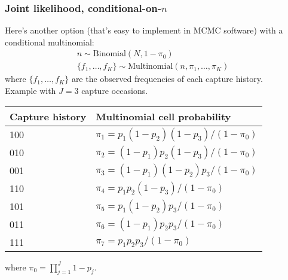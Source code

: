 \documentclass[color=usenames,dvipsnames]{beamer}\usepackage[]{graphicx}\usepackage[]{color}
\begin{document}
\begin{frame}
  \frametitle{Joint likelihood, conditional-on-$n$}
  \footnotesize
  Here's another option (that's easy to implement in MCMC software) with a conditional multinomial: \\
  \begin{gather*}
    n \sim \mathrm{Binomial}\left(N, 1-\pi_0\right)                      \\
    \{f_1, \dots, f_K\} \sim \mathrm{Multinomial}(n, \pi_1, \dots, \pi_K) \;\;
  \end{gather*}
  where $\{f_1, \dots, f_K\}$ are the observed frequencies of each
  capture history. \\
  \pause \vfill
  Example with $J=3$ capture occasions.                                          \\
  \scriptsize
  \vspace{6pt}
  \centering
    \begin{tabular}{ll}
      \hline
      Capture history & Multinomial cell probability        \\
      \hline
      100                   & $\pi_1=p_1(1-p_2)(1-p_3)/(1-\pi_0)$ \\
      010                   & $\pi_2=(1-p_1)p_2(1-p_3)/(1-\pi_0)$ \\
      001                   & $\pi_3=(1-p_1)(1-p_2)p_3/(1-\pi_0)$ \\
      110                   & $\pi_4=p_1p_2(1-p_3)/(1-\pi_0)$     \\
      101                   & $\pi_5=p_1(1-p_2)p_3/(1-\pi_0)$     \\
      011                   & $\pi_6=(1-p_1)p_2p_3/(1-\pi_0)$     \\
      111                   & $\pi_7 = p_1p_2p_3/(1-\pi_0)$       \\
      \hline
    \end{tabular}
    \flushleft
  where $\pi_0=\prod_{j=1}^J 1-p_j$.                                     \\
\end{frame}
\end{document}
